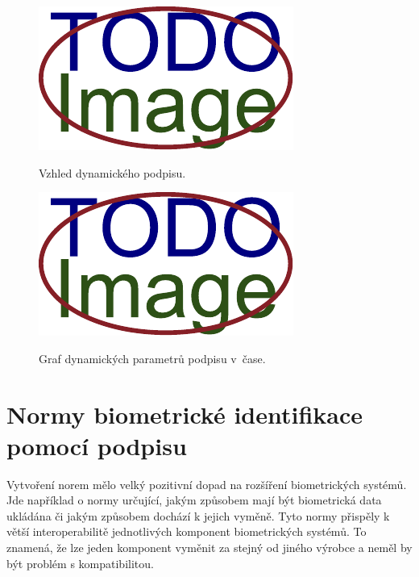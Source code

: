 \begin{figure}[h]
  \centering
  \begin{minipage}{0.45\textwidth}\label{fig:first-image}
      \centering
      \includegraphics[width=\textwidth]{obrazky-figures/placeholder.pdf}
      \caption{Vzhled dynamického podpisu.}
  \end{minipage}\hfill
  \begin{minipage}{0.45\textwidth}\label{fig:second-image}
      \centering
      \includegraphics[width=\textwidth]{obrazky-figures/placeholder.pdf}
      \caption{Graf dynamických parametrů podpisu v~čase.}
  \end{minipage}
\end{figure}

\section{Normy biometrické identifikace pomocí podpisu}

Vytvoření norem mělo velký pozitivní dopad na rozšíření biometrických systémů.                                                %
Jde například o normy určující, jakým způsobem mají být biometrická data ukládána či jakým způsobem dochází k jejich vyměně.  %
Tyto normy přispěly k větší interoperabilitě jednotlivých komponent biometrických systémů.                                    %
To znamená, že lze jeden komponent vyměnit za stejný od jiného výrobce a neměl by být problém s kompatibilitou.~\cite{DrahanskýMartin2011}%
\newline 

